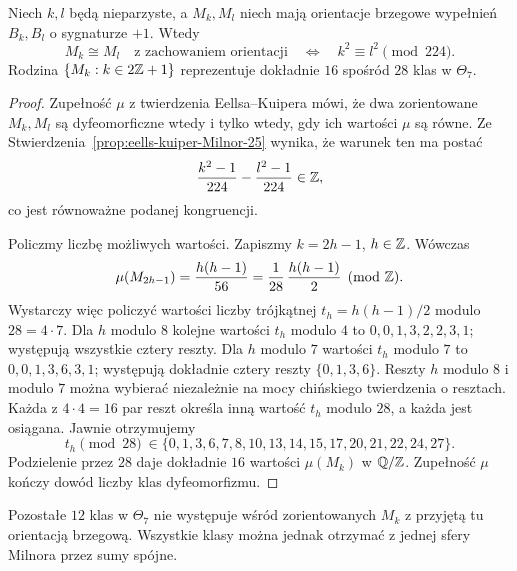 \begin{twierdzenie}
\label{thm:milnor-classification-25}
Niech $k,l$ będą nieparzyste, a
$M_k,M_l$ niech mają orientacje
brzegowe wypełnień $B_k,B_l$
o sygnaturze $+1$. Wtedy
\[
 M_k\cong M_l\quad\text{z zachowaniem orientacji}
 \quad\Longleftrightarrow\quad
 k^2\equiv l^2\pmod{224}.
\]
Rodzina $\{M_k:k\in2\mathbb{Z}+1\}$
reprezentuje dokładnie $16$ spośród
$28$ klas w $\Theta_7$.
\end{twierdzenie}
\begin{proof}
Zupełność $\mu$ z twierdzenia
Eellsa--Kuipera mówi, że dwa
zorientowane $M_k,M_l$ są
dyfeomorficzne wtedy i tylko wtedy,
gdy ich wartości $\mu$ są równe.
Ze Stwierdzenia~\ref{prop:eells-kuiper-Milnor-25}
wynika, że warunek ten ma postać
\[
 \frac{k^2-1}{224}-\frac{l^2-1}{224}
 \in\mathbb{Z},
\]
co jest równoważne podanej kongruencji.

Policzmy liczbę możliwych wartości.
Zapiszmy $k=2h-1$, $h\in\mathbb{Z}$. Wówczas
\[
 \mu(M_{2h-1})
 =\frac{h(h-1)}{56}
 =\frac{1}{28}\,\frac{h(h-1)}2
 \pmod{\mathbb{Z}}.
\]
Wystarczy więc policzyć wartości
liczby trójkątnej
$t_h=h(h-1)/2$ modulo $28=4\cdot7$.
Dla $h$ modulo $8$ kolejne wartości
$t_h$ modulo $4$ to
$0,0,1,3,2,2,3,1$; występują
wszystkie cztery reszty. Dla $h$
modulo $7$ wartości $t_h$ modulo
$7$ to $0,0,1,3,6,3,1$;
występują dokładnie cztery reszty
$\{0,1,3,6\}$.
Reszty $h$ modulo $8$ i modulo $7$
można wybierać niezależnie na mocy
chińskiego twierdzenia o resztach.
Każda z $4\cdot4=16$ par reszt
określa inną wartość $t_h$ modulo
$28$, a każda jest osiągana.
Jawnie otrzymujemy
\[
 t_h\pmod{28}\ \in
 \{0,1,3,6,7,8,10,13,14,15,17,
   20,21,22,24,27\}.
\]
Podzielenie przez $28$ daje dokładnie
$16$ wartości $\mu(M_k)$ w $\mathbb{Q}/\mathbb{Z}$.
Zupełność $\mu$ kończy dowód liczby
klas dyfeomorfizmu.
\end{proof}

Pozostałe $12$ klas w $\Theta_7$
nie występuje wśród zorientowanych
$M_k$ z przyjętą tu orientacją
brzegową. Wszystkie klasy można
jednak otrzymać z jednej sfery
Milnora przez sumy spójne.

